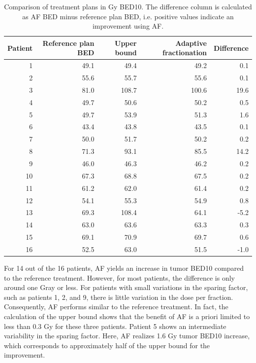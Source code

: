 \documentclass[11pt]{article}
\newcommand{\toprule}{\hline}
\newcommand{\midrule}{\hline}
\newcommand{\bottomrule}{\hline}
\begin{document}
\begin{table}[ht]
\centering
\caption{Comparison of treatment plans in Gy BED10. The difference column is calculated as AF BED minus reference plan BED, i.e. positive values indicate an improvement using AF.}
\label{tab:all-patients}
\begin{tabular}{rrrrr}
\toprule
Patient & Reference plan BED & Upper bound & Adaptive fractionation & Difference \\
\midrule
1 & 49.1 & 49.4 & 49.2 & 0.1 \\
2 & 55.6 & 55.7 & 55.6 & 0.1 \\
3 & 81.0 & 108.7 & 100.6 & 19.6 \\
4 & 49.7 & 50.6 & 50.2 & 0.5 \\
5 & 49.7 & 53.9 & 51.3 & 1.6 \\
6 & 43.4 & 43.8 & 43.5 & 0.1 \\
7 & 50.0 & 51.7 & 50.2 & 0.2 \\
8 & 71.3 & 93.1 & 85.5 & 14.2 \\
9 & 46.0 & 46.3 & 46.2 & 0.2 \\
10 & 67.3 & 68.8 & 67.5 & 0.2 \\
11 & 61.2 & 62.0 & 61.4 & 0.2 \\
12 & 54.1 & 55.3 & 54.9 & 0.8 \\
13 & 69.3 & 108.4 & 64.1 & -5.2 \\
14 & 63.0 & 63.6 & 63.3 & 0.3 \\
15 & 69.1 & 70.9 & 69.7 & 0.6 \\
16 & 52.5 & 63.0 & 51.5 & -1.0 \\
\bottomrule
\end{tabular}
\end{table}

For 14 out of the 16 patients, AF yields an increase in tumor BED10 compared to the reference treatment. However, for most patients, the difference is only around one Gray or less. For patients with small variations in the sparing factor, such as patients 1, 2, and 9, there is little variation in the dose per fraction. Consequently, AF performs similar to the reference treatment. In fact, the calculation of the upper bound shows that the benefit of AF is a priori limited to less than 0.3 Gy for these three patients. Patient 5 shows an intermediate variability in the sparing factor. Here, AF realizes 1.6 Gy tumor BED10 increase, which corresponds to approximately half of the upper bound for the improvement.
\end{document}
